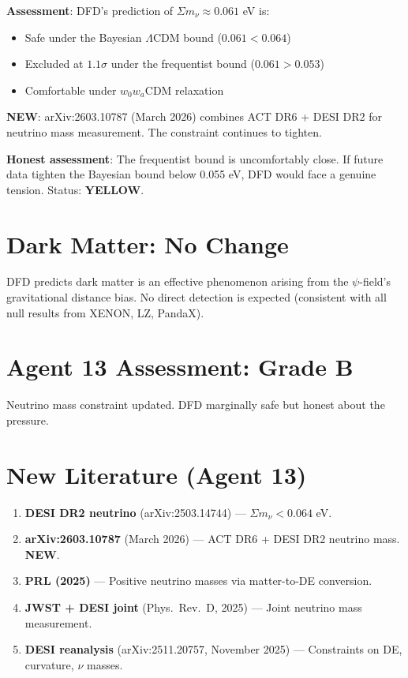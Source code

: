 \documentclass[11pt,a4paper]{article}
\newcommand{\YELLOW}{\textcolor{dfdyellow}{\textbf{YELLOW}}}
\newcommand{\NEW}{\textcolor{dfdblue}{\textbf{NEW}}}
\begin{document}
\textbf{Assessment}: DFD's prediction of $\Sigma m_\nu \approx 0.061$ eV is:
\begin{itemize}
\item Safe under the Bayesian $\Lambda$CDM bound ($0.061 < 0.064$)
\item Excluded at $1.1\sigma$ under the frequentist bound ($0.061 > 0.053$)
\item Comfortable under $w_0 w_a$CDM relaxation
\end{itemize}

\NEW: arXiv:2603.10787 (March 2026) combines ACT DR6 + DESI DR2 for neutrino mass measurement. The constraint continues to tighten.

\textbf{Honest assessment}: The frequentist bound is uncomfortably close. If future data tighten the Bayesian bound below 0.055 eV, DFD would face a genuine tension. Status: \YELLOW.

\section{Dark Matter: No Change}

DFD predicts dark matter is an effective phenomenon arising from the $\psi$-field's gravitational distance bias. No direct detection is expected (consistent with all null results from XENON, LZ, PandaX).

\section{Agent 13 Assessment: Grade B}

Neutrino mass constraint updated. DFD marginally safe but honest about the pressure.

\section{New Literature (Agent 13)}

\begin{enumerate}
\item \textbf{DESI DR2 neutrino} (arXiv:2503.14744) --- $\Sigma m_\nu < 0.064$ eV.
\item \textbf{arXiv:2603.10787} (March 2026) --- ACT DR6 + DESI DR2 neutrino mass. \NEW.
\item \textbf{PRL (2025)} --- Positive neutrino masses via matter-to-DE conversion.
\item \textbf{JWST + DESI joint} (Phys.\ Rev.\ D, 2025) --- Joint neutrino mass measurement.
\item \textbf{DESI reanalysis} (arXiv:2511.20757, November 2025) --- Constraints on DE, curvature, $\nu$ masses.
\end{enumerate}
\end{document}
